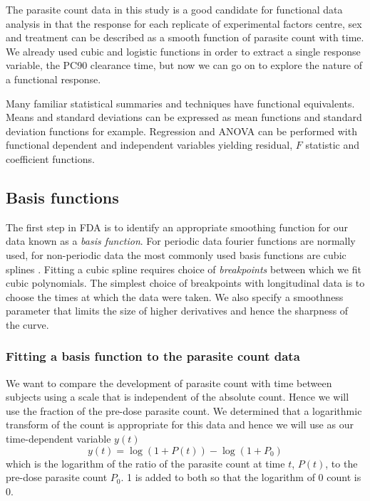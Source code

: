 The parasite count data in this study is a good candidate for functional data analysis in that the response for each replicate of experimental factors centre, sex and treatment can be described as a smooth function of parasite count with time. We already used cubic and logistic functions in order to extract a single response variable, the PC90 clearance time, but now we can go on to explore the nature of a functional response.

Many familiar statistical summaries and techniques have functional equivalents. Means and standard deviations can be expressed as mean functions and standard deviation functions for example. Regression and ANOVA can be performed with functional dependent and independent variables yielding residual, $F$ statistic and coefficient functions.
\subsection{Basis functions}
The first step in FDA is to identify an appropriate smoothing function for our data known as a \emph{basis function}. For periodic data fourier functions are normally used, for non-periodic data the most commonly used basis functions are cubic splines \cite{fdaweb}. Fitting a cubic spline requires choice of \emph{breakpoints} between which we fit cubic polynomials. The simplest choice of breakpoints with longitudinal data is to choose the times at which the data were taken. We also specify a smoothness parameter that limits the size of higher derivatives and hence the sharpness of the curve.

\subsubsection*{Fitting a basis function to the parasite count data}

We want to compare the development of parasite count with time between subjects using a scale that is independent of the absolute count. Hence we will use the fraction of the pre-dose parasite count. We determined that a logarithmic transform of the count is appropriate for this data and hence we will use as our time-dependent variable $y(t)$
$$y(t)=\log (1+P(t))-\log(1+P_{0})$$
which is the logarithm of the ratio of the parasite count at time $t$, $P(t)$, to the pre-dose parasite count $P_{0}$. 1 is added to both so that the logarithm of 0 count is 0.


